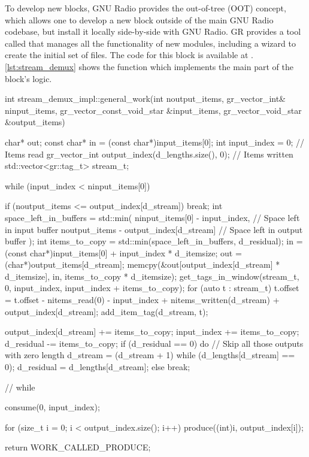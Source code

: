 To develop new blocks, GNU Radio provides the out-of-tree (OOT) concept, which allows one to develop a new block outside of the main GNU Radio codebase, but install it locally side-by-side with GNU Radio. GR provides a tool called  that manages all the functionality of new modules, including a wizard to create the initial set of files. The code for this block is available at \cite{gr_stream_demux}. \autoref{lst:stream_demux} shows the  function which implements the main part of the block's logic.

\begin{cpp}[label={lst:stream_demux},caption={Stream Demux \code{general\_work()} function}]
int stream_demux_impl::general_work(int noutput_items,
                                gr_vector_int& ninput_items,
                                gr_vector_const_void_star &input_items,
                                gr_vector_void_star &output_items)
{
    char* out;
    const char* in = (const char*)input_items[0];
    int input_index = 0;                             // Items read
    gr_vector_int output_index(d_lengths.size(), 0); // Items written
    std::vector<gr::tag_t> stream_t;

    while (input_index < ninput_items[0]) {
        if (noutput_items <= output_index[d_stream]) {
            break;
        }
        int space_left_in_buffers = std::min(
            ninput_items[0] - input_index,         // Space left in input buffer
            noutput_items - output_index[d_stream] // Space left in output buffer
        );
        int items_to_copy = std::min(space_left_in_buffers, d_residual);
        in = (const char*)input_items[0] + input_index * d_itemsize;
        out = (char*)output_items[d_stream];
        memcpy(&out[output_index[d_stream] * d_itemsize], in, items_to_copy * d_itemsize);
        get_tags_in_window(stream_t,
                           0,
                           input_index,
                           input_index + items_to_copy);
        for (auto t : stream_t) {
             t.offset = t.offset - nitems_read(0) - input_index +
                        nitems_written(d_stream) + output_index[d_stream];
             add_item_tag(d_stream, t);
        }

        output_index[d_stream] += items_to_copy;
        input_index += items_to_copy;
        d_residual -= items_to_copy;
        if (d_residual == 0) {
            do { // Skip all those outputs with zero length
                d_stream = (d_stream + 1) %
            } while (d_lengths[d_stream] == 0);
            d_residual = d_lengths[d_stream];
        } else {
            break;
        }
    } // while

    consume(0, input_index);

    for (size_t i = 0; i < output_index.size(); i++) {
        produce((int)i, output_index[i]);
    }

    return WORK_CALLED_PRODUCE;
}
\end{cpp}

